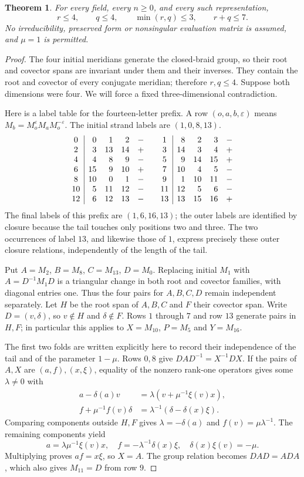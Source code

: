 \documentclass[11pt]{article}
\newtheorem{theorem}{Theorem}
\begin{document}
\begin{theorem}\label{thm:paired}
For every field, every $n\ge0$, and every such representation,
\[
 r\le4,\qquad q\le4,\qquad \min(r,q)\le3,\qquad r+q\le7.
\]
No irreducibility, preserved form or nonsingular evaluation matrix is
assumed, and $\mu=1$ is permitted.
\end{theorem}
\begin{proof}
The four initial meridians generate the closed-braid group, so their
root and covector spans are invariant under them and their inverses.
They contain the root and covector of every conjugate meridian;
therefore $r,q\le4$. Suppose both dimensions were four.
We will force a fixed three-dimensional contradiction.

Here is a label table for the fourteen-letter prefix. A row
$(o,a,b,\varepsilon)$ means $M_b=M_o^\varepsilon M_aM_o^{-\varepsilon}$.
The initial strand labels are $(1,0,8,13)$.
\[
\begin{array}{c|rrrr@{\qquad}c|rrrr}
0&0&1&2&-&1&8&2&3&-\\
2&3&13&14&+&3&14&3&4&+\\
4&4&8&9&-&5&9&14&15&+\\
6&15&9&10&+&7&10&4&5&-\\
8&10&0&1&-&9&1&10&11&-\\
10&5&11&12&-&11&12&5&6&-\\
12&6&12&13&-&13&13&15&16&+
\end{array}
\]
The final labels of this prefix are $(1,6,16,13)$; the outer labels are
identified by closure because the tail touches only positions two and
three. The two occurrences of label $13$, and likewise those of $1$,
express precisely these outer closure relations, independently of the
length of the tail.

Put $A=M_2$, $B=M_8$, $C=M_{13}$, $D=M_0$.
Replacing initial $M_1$ with $A=D^{-1}M_1D$ is a triangular change in
both root and covector families, with diagonal entries one. Thus the
four pairs for $A,B,C,D$ remain independent separately.
Let $H$ be the root span of $A,B,C$ and $F$ their covector span.
Write $D=(v,\delta)$, so $v\notin H$ and $\delta\notin F$.
Rows $1$ through $7$ and row $13$ generate pairs in $H,F$; in particular
this applies to $X=M_{10}$, $P=M_5$ and $Y=M_{16}$.

The first two folds are written explicitly here to record their
independence of the tail and of the parameter $1-\mu$.
Rows $0,8$ give $DAD^{-1}=X^{-1}DX$. If the pairs of $A,X$ are
$(a,f),(x,\xi)$, equality of the nonzero rank-one operators gives some
$\lambda\ne0$ with
\begin{align*}
 a-\delta(a)v&=\lambda(v+\mu^{-1}\xi(v)x),\\
 f+\mu^{-1}f(v)\delta&=\lambda^{-1}(\delta-\delta(x)\xi).
\end{align*}
Comparing components outside $H,F$ gives
$\lambda=-\delta(a)$ and $f(v)=\mu\lambda^{-1}$.
The remaining components yield
\[
 a=\lambda\mu^{-1}\xi(v)x,\quad
 f=-\lambda^{-1}\delta(x)\xi,\quad
 \delta(x)\xi(v)=-\mu.
\]
Multiplying proves $af=x\xi$, so $X=A$. The group relation becomes
$DAD=ADA$, which also gives $M_{11}=D$ from row $9$.


\end{proof}
\end{document}
